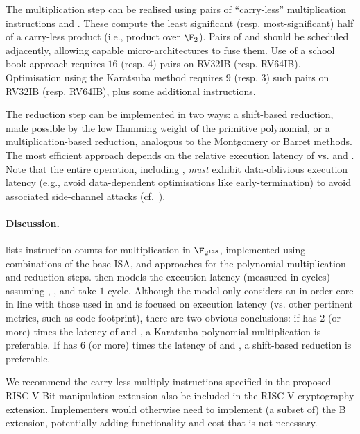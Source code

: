The multiplication step 
can be realised using pairs of ``carry-less'' multiplication instructions
 and .
These compute the least significant (resp. most-significant) 
half of a carry-less product (i.e., product over $\F_2$).
Pairs of 
 and 
should be scheduled adjacently, allowing capable micro-architectures
to fuse them.
Use of a school book approach 
requires
$16$ (resp. $4$) pairs 
on RV32IB (resp. RV64IB).
Optimisation using the Karatsuba method
requires
$ 9$ (resp. $3$) such pairs 
on RV32IB (resp. RV64IB),
plus some additional  instructions.

The reduction step
can be implemented in two ways:
a shift-based reduction, made possible by the low Hamming weight of the
primitive polynomial,
or
a multiplication-based reduction, analogous to the Montgomery or Barret
methods.
The most efficient approach depends on the relative execution 
latency of
vs.
 and .
Note that the entire  operation, including ,
{\em must} exhibit data-oblivious execution latency 
(e.g., avoid data-dependent optimisations like early-termination)
to avoid associated side-channel attacks (cf.~\cite{GOPT:09}).


\paragraph{Discussion.}

lists instruction counts for 
multiplication in $\F_{2^{128}}$,
implemented using combinations of the base ISA, and approaches
for the polynomial multiplication and reduction steps.
then models the execution latency 
(measured in cycles)
assuming , , and  take $1$ cycle.
Although the model only considers an in-order core in line with those used
in  and is focused on execution latency
(vs. other pertinent metrics, such as code footprint),
there are two obvious conclusions:
if
has $2$ (or more) times the latency of
 and ,
a 
Karatsuba
polynomial multiplication
is preferable.
If
has $6$ (or more) times the latency of
 and ,
a shift-based 
reduction 
is preferable.

We recommend the carry-less multiply instructions
specified in the proposed RISC-V Bit-manipulation extension also be included
in the RISC-V cryptography extension.
Implementers would otherwise need to implement (a subset of) the B
extension, potentially adding functionality and cost that is not
necessary.

